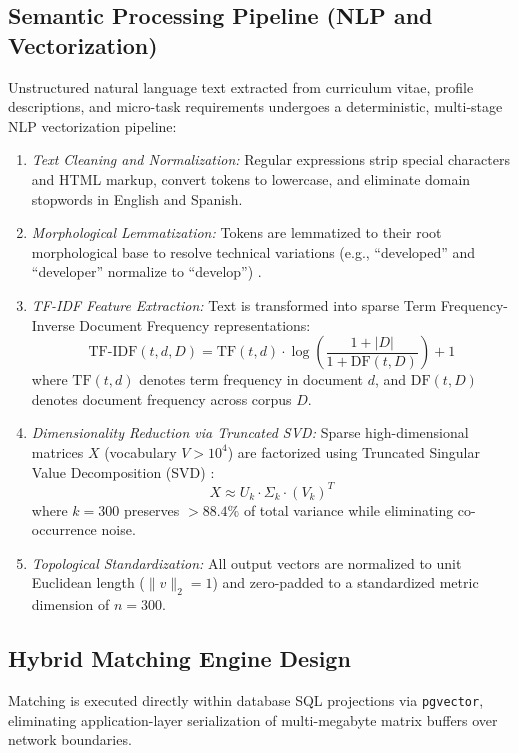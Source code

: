 \documentclass[a4paper,fleqn]{cas-dc}
\begin{document}
\subsection{Semantic Processing Pipeline (NLP and Vectorization)}
Unstructured natural language text extracted from curriculum vitae, profile descriptions, and micro-task requirements undergoes a deterministic, multi-stage NLP vectorization pipeline:
\begin{enumerate}
    \item \textit{Text Cleaning and Normalization:} Regular expressions strip special characters and HTML markup, convert tokens to lowercase, and eliminate domain stopwords in English and Spanish.
    \item \textit{Morphological Lemmatization:} Tokens are lemmatized to their root morphological base to resolve technical variations (e.g., ``developed'' and ``developer'' normalize to ``develop'') \cite{gadegaonkar2023}.
    \item \textit{TF-IDF Feature Extraction:} Text is transformed into sparse Term Frequency-Inverse Document Frequency representations:
    \begin{equation}
        \text{TF-IDF}(t, d, D) = \text{TF}(t, d) \cdot \log\left( \frac{1 + |D|}{1 + \text{DF}(t, D)} \right) + 1
    \end{equation}
    where $\text{TF}(t, d)$ denotes term frequency in document $d$, and $\text{DF}(t, D)$ denotes document frequency across corpus $D$.
    \item \textit{Dimensionality Reduction via Truncated SVD:} Sparse high-dimensional matrices $X$ (vocabulary $V > 10^4$) are factorized using Truncated Singular Value Decomposition (SVD) \cite{alsaif2022}:
    \begin{equation}
        X \approx U_k \cdot \Sigma_k \cdot (V_k)^T
    \end{equation}
    where $k = 300$ preserves $>88.4\%$ of total variance while eliminating co-occurrence noise.
    \item \textit{Topological Standardization:} All output vectors are normalized to unit Euclidean length ($\|v\|_2 = 1$) and zero-padded to a standardized metric dimension of $n = 300$.
\end{enumerate}

\subsection{Hybrid Matching Engine Design}
Matching is executed directly within database SQL projections via \texttt{pgvector}, eliminating application-layer serialization of multi-megabyte matrix buffers over network boundaries.
\end{document}
